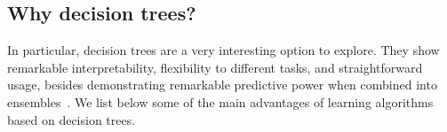 \begin{itemize}
\subsection{Why decision trees?}

In particular, decision trees are a very interesting option to explore. They show remarkable interpretability, flexibility to different tasks, and straightforward usage, besides demonstrating remarkable predictive power when combined into ensembles~\cite{breiman2001random, whyarebestfortabular}.  %
We list below some of the main advantages of learning algorithms based on decision trees.


\end{itemize}
